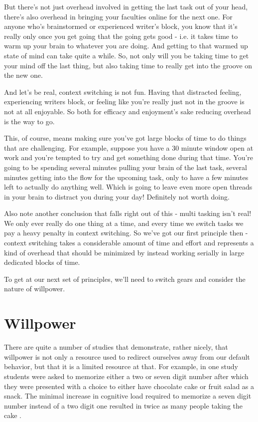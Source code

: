 \documentclass[11pt,a5paper]{book}
\begin{document}
But there's not just overhead involved in getting the last task out of your head, there's also overhead in bringing your faculties online for the next one. For anyone who's brainstormed or experienced writer's block, you know that it's really only once you get going that the going gets good - i.e. it takes time to warm up your brain to whatever you are doing. And getting to that warmed up state of mind can take quite a while. So, not only will you be taking time to get your mind off the last thing, but also taking time to really get into the groove on the new one. 
\newline

And let's be real, context switching is not fun. Having that distracted feeling, experiencing writers block, or feeling like you're really just not in the groove is not at all enjoyable. So both for efficacy and enjoyment's sake reducing overhead is the way to go. 
\newline

This, of course, means making sure you've got large blocks of time to do things that are challenging. For example, suppose you have a 30 minute window open at work and you're tempted to try and get something done during that time. You're going to be spending several minutes pulling your brain of the last task, several minutes getting into the flow for the upcoming task, only to have a few minutes left to actually do anything well. Which is going to leave even more open threads in your brain to distract you during your day! Definitely not worth doing. 
\newline

Also note another conclusion that falls right out of this - multi tasking isn't real! We only ever really do one thing at a time, and every time we switch tasks we pay a heavy penalty in context switching. So we've got our first principle then - context switching takes a considerable amount of time and effort and represents a kind of overhead that should be minimized by instead working serially in large dedicated blocks of time.
\newline

To get at our next set of principles, we'll need to switch gears and consider the nature of willpower.

\section{Willpower}
There are quite a number of studies that demonstrate, rather nicely, that willpower is not only a resource used to redirect ourselves away from our default behavior, but that it is a limited resource at that. For example, in one study students were asked to memorize either a two or seven digit number after which they were presented with a choice to either have chocolate cake or fruit salad as a snack. The minimal increase in cognitive load required to memorize a seven digit number instead of a two digit one resulted in twice as many people taking the cake \cite{keller}. 
\newline
\end{document}
